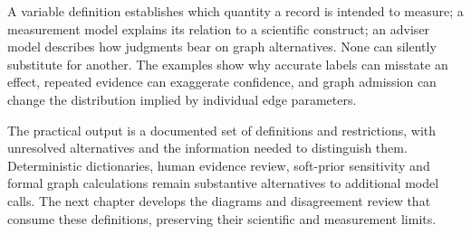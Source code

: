 A variable definition establishes which quantity a record is intended to
measure; a measurement model explains its relation to a scientific construct;
an adviser model describes how judgments bear on graph alternatives. None can
silently substitute for another. The examples show why accurate labels can
misstate an effect, repeated evidence can exaggerate confidence, and graph
admission can change the distribution implied by individual edge parameters.

The practical output is a documented set of definitions and restrictions,
with unresolved alternatives and the information needed to distinguish them.
Deterministic dictionaries, human evidence review, soft-prior sensitivity and
formal graph calculations remain substantive alternatives to additional model
calls. The next chapter develops the diagrams and disagreement review that
consume these definitions, preserving their scientific and measurement limits.
\label{exec18:bayesian-advice-end}

